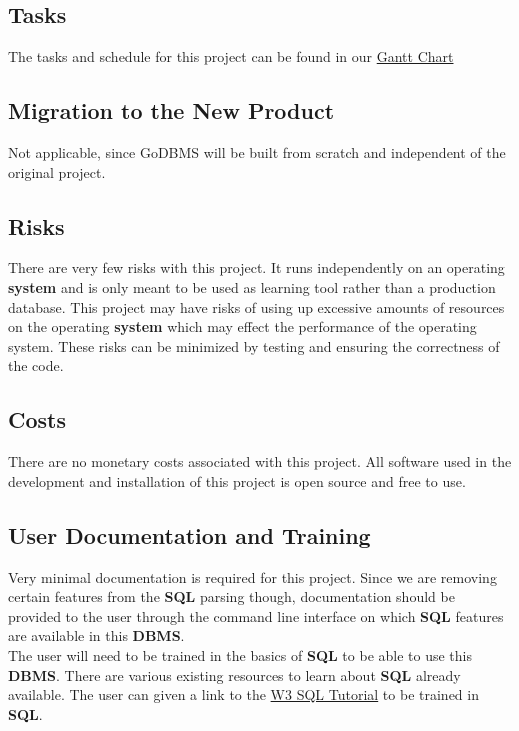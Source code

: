 \documentclass[12pt, titlepage]{article}
\begin{document}
\subsection{Tasks}

The tasks and schedule for this project can be found in our \href{https://gitlab.cas.mcmaster.ca/ahmedf46/GoDBMS_L01_GRP07/-/blob/main/ProjectSchedule/GanttChart.pdf}{Gantt Chart}

\subsection{Migration to the New Product}

Not applicable, since GoDBMS will be built from scratch and independent of the original project.

\subsection{Risks}

There are very few risks with this project. It runs independently on an operating \textbf{system} and is only meant to be used as learning tool rather than a production database. This project may have risks of using up excessive amounts of resources on the operating \textbf{system} which may effect the performance of the operating system. These risks can be minimized by testing and ensuring the correctness of the code.

\subsection{Costs}

There are no monetary costs associated with this project. All software used in the development and installation of this project is open source and free to use.

\subsection{User Documentation and Training}

Very minimal documentation is required for this project. Since we are removing certain features from the \textbf{SQL} parsing though, documentation should be provided to the user through the command line interface on which \textbf{SQL} features are available in this \textbf{DBMS}.\\

\noindent The user will need to be trained in the basics of \textbf{SQL} to be able to use this \textbf{DBMS}. There are various existing resources to learn about \textbf{SQL} already available. The user can given a link to the \href{https://www.w3schools.com/sql/}{W3 SQL Tutorial} to be trained in \textbf{SQL}.
\end{document}
